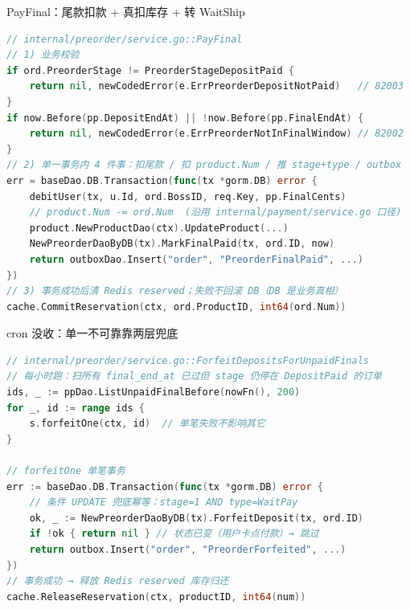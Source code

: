 \documentclass[aspectratio=169,11pt]{beamer}
\begin{document}
\begin{frame}{PayFinal：尾款扣款 + 真扣库存 + 转 WaitShip}
\begin{lstlisting}[language=Go]
// internal/preorder/service.go::PayFinal
// 1) 业务校验
if ord.PreorderStage != PreorderStageDepositPaid {
    return nil, newCodedError(e.ErrPreorderDepositNotPaid)   // 82003
}
if now.Before(pp.DepositEndAt) || !now.Before(pp.FinalEndAt) {
    return nil, newCodedError(e.ErrPreorderNotInFinalWindow) // 82002
}
// 2) 单一事务内 4 件事：扣尾款 / 扣 product.Num / 推 stage+type / outbox
err = baseDao.DB.Transaction(func(tx *gorm.DB) error {
    debitUser(tx, u.Id, ord.BossID, req.Key, pp.FinalCents)
    // product.Num -= ord.Num  (沿用 internal/payment/service.go 口径)
    product.NewProductDao(ctx).UpdateProduct(...)
    NewPreorderDaoByDB(tx).MarkFinalPaid(tx, ord.ID, now)
    return outboxDao.Insert("order", "PreorderFinalPaid", ...)
})
// 3) 事务成功后清 Redis reserved；失败不回滚 DB（DB 是业务真相）
cache.CommitReservation(ctx, ord.ProductID, int64(ord.Num))
\end{lstlisting}
\end{frame}

\begin{frame}{cron 没收：单一不可靠靠两层兜底}
\begin{lstlisting}[language=Go]
// internal/preorder/service.go::ForfeitDepositsForUnpaidFinals
// 每小时跑：扫所有 final_end_at 已过但 stage 仍停在 DepositPaid 的订单
ids, _ := ppDao.ListUnpaidFinalBefore(nowFn(), 200)
for _, id := range ids {
    s.forfeitOne(ctx, id)  // 单笔失败不影响其它
}

// forfeitOne 单笔事务
err := baseDao.DB.Transaction(func(tx *gorm.DB) error {
    // 条件 UPDATE 兜底幂等：stage=1 AND type=WaitPay
    ok, _ := NewPreorderDaoByDB(tx).ForfeitDeposit(tx, ord.ID)
    if !ok { return nil } // 状态已变（用户卡点付款）→ 跳过
    return outbox.Insert("order", "PreorderForfeited", ...)
})
// 事务成功 → 释放 Redis reserved 库存归还
cache.ReleaseReservation(ctx, productID, int64(num))
\end{lstlisting}
\vspace{0.5mm}
\end{frame}
\end{document}
